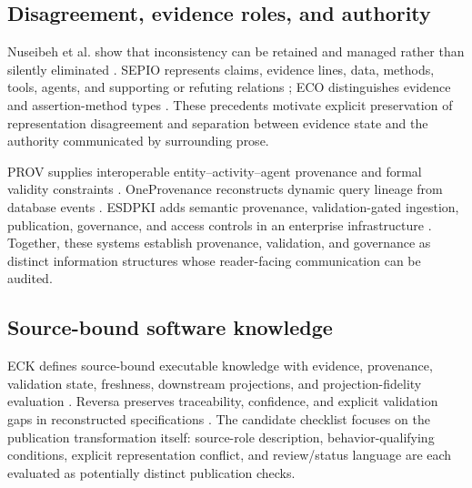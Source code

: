 \documentclass[a4paper,fleqn]{cas-dc}
\begin{document}
\subsection{Disagreement, evidence roles, and authority}
Nuseibeh et al. show that inconsistency can be retained and managed rather than silently eliminated \citep{Nuseibeh2001}. SEPIO represents claims, evidence lines, data, methods, tools, agents, and supporting or refuting relations \citep{Brush2016}; ECO distinguishes evidence and assertion-method types \citep{Giglio2019}. These precedents motivate explicit preservation of representation disagreement and separation between evidence state and the authority communicated by surrounding prose.

PROV supplies interoperable entity--activity--agent provenance and formal validity constraints \citep{Missier2013,W3CProvConstraints2013}. OneProvenance reconstructs dynamic query lineage from database events \citep{Psallidas2023}. ESDPKI adds semantic provenance, validation-gated ingestion, publication, governance, and access controls in an enterprise infrastructure \citep{Sadiq2026}. Together, these systems establish provenance, validation, and governance as distinct information structures whose reader-facing communication can be audited.

\subsection{Source-bound software knowledge}
ECK defines source-bound executable knowledge with evidence, provenance, validation state, freshness, downstream projections, and projection-fidelity evaluation \citep{Gao2026}. Reversa preserves traceability, confidence, and explicit validation gaps in reconstructed specifications \citep{MacedoCosta2026}. The candidate checklist focuses on the publication transformation itself: source-role description, behavior-qualifying conditions, explicit representation conflict, and review/status language are each evaluated as potentially distinct publication checks.
\end{document}
